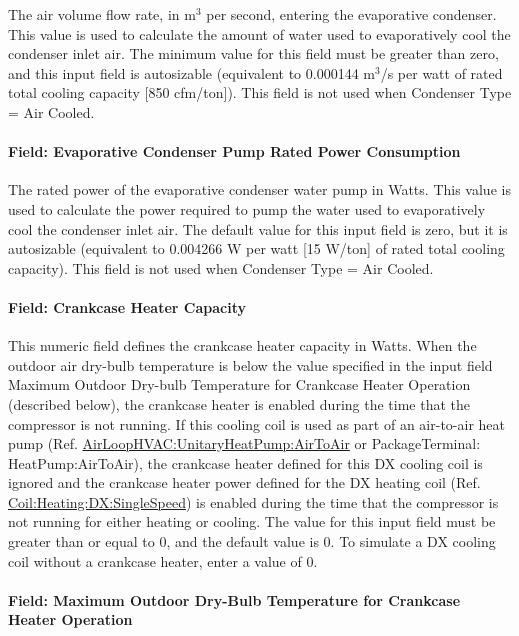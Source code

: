 The air volume flow rate, in m\(^{3}\) per second, entering the evaporative condenser. This value is used to calculate the amount of water used to evaporatively cool the condenser inlet air. The minimum value for this field must be greater than zero, and this input field is autosizable (equivalent to 0.000144 m\(^{3}\)/s per watt of rated total cooling capacity {[}850 cfm/ton{]}). This field is not used when Condenser Type = Air Cooled.

\paragraph{Field: Evaporative Condenser Pump Rated Power Consumption}\label{field-evaporative-condenser-pump-rated-power-consumption}

The rated power of the evaporative condenser water pump in Watts. This value is used to calculate the power required to pump the water used to evaporatively cool the condenser inlet air. The default value for this input field is zero, but it is autosizable (equivalent to 0.004266 W per watt {[}15 W/ton{]} of rated total cooling capacity). This field is not used when Condenser Type = Air Cooled.

\paragraph{Field: Crankcase Heater Capacity}\label{field-crankcase-heater-capacity}

This numeric field defines the crankcase heater capacity in Watts. When the outdoor air dry-bulb temperature is below the value specified in the input field Maximum Outdoor Dry-bulb Temperature for Crankcase Heater Operation (described below), the crankcase heater is enabled during the time that the compressor is not running. If this cooling coil is used as part of an air-to-air heat pump (Ref. \hyperref[airloophvacunitaryheatpumpairtoair]{AirLoopHVAC:UnitaryHeatPump:AirToAir} or PackageTerminal: HeatPump:AirToAir), the crankcase heater defined for this DX cooling coil is ignored and the crankcase heater power defined for the DX heating coil (Ref. \hyperref[coilheatingdxsinglespeed]{Coil:Heating:DX:SingleSpeed}) is enabled during the time that the compressor is not running for either heating or cooling. The value for this input field must be greater than or equal to 0, and the default value is 0. To simulate a DX cooling coil without a crankcase heater, enter a value of 0.

\paragraph{Field: Maximum Outdoor Dry-Bulb Temperature for Crankcase Heater Operation}\label{field-maximum-outdoor-dry-bulb-temperature-for-crankcase-heater-operation}

